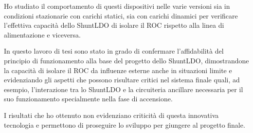 \documentclass[a4paper,12pt,italian]{article}
\begin{document}

Ho studiato il comportamento di questi dispositivi nelle varie versioni sia in condizioni stazionarie con carichi statici, sia con carichi dinamici per verificare l'effettiva capacità dello ShuntLDO di isolare il ROC rispetto alla linea di alimentazione e viceversa. 

In questo lavoro di tesi sono stato in grado di confermare l'affidabilità del principio di funzionamento alla base del progetto dello ShuntLDO, dimostrandone la capacità di isolare il ROC da influenze esterne anche in situazioni limite e evidenziando gli aspetti che possono risultare critici nel sistema finale quali, ad esempio, l'interazione tra lo ShuntLDO e la circuiteria ancillare necessaria per il suo funzionamento specialmente nella fase di accensione.

I risultati che ho ottenuto non evidenziano criticit\`a di questa innovativa tecnologia e permettono di proseguire lo sviluppo per giungere al progetto finale.
\end{document}
